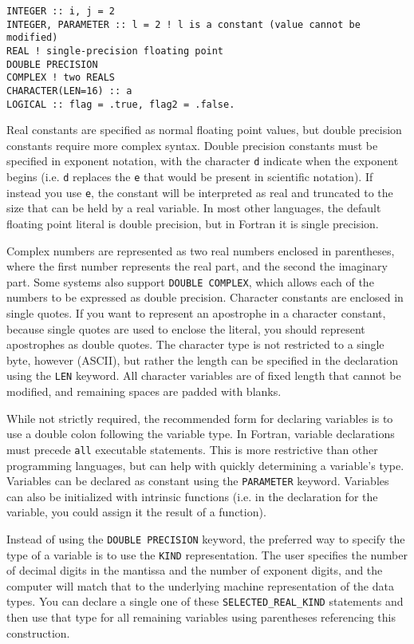 \documentclass[10pt]{article}
\begin{document}
\begin{lstlisting}
INTEGER :: i, j = 2
INTEGER, PARAMETER :: l = 2 ! l is a constant (value cannot be modified)
REAL ! single-precision floating point
DOUBLE PRECISION
COMPLEX ! two REALS
CHARACTER(LEN=16) :: a
LOGICAL :: flag = .true, flag2 = .false.
\end{lstlisting}

Real constants are specified as normal floating point values, but double precision constants require more complex syntax. Double precision constants must be specified in exponent notation, with the character {\tt d} indicate when the exponent begins (i.e. {\tt d} replaces the {\tt e} that would be present in scientific notation). If instead you use {\tt e}, the constant will be interpreted as real and truncated to the size that can be held by a real variable. In most other languages, the default floating point literal is double precision, but in Fortran it is single precision.

Complex numbers are represented as two real numbers enclosed in parentheses, where the first number represents the real part, and the second the imaginary part. Some systems also support {\tt DOUBLE COMPLEX}, which allows each of the numbers to be expressed as double precision. Character constants are enclosed in single quotes. If you want to represent an apostrophe in a character constant, because single quotes are used to enclose the literal, you should represent apostrophes as double quotes. The character type is not restricted to a single byte, however (ASCII), but rather the length can be specified in the declaration using the {\tt LEN} keyword. All character variables are of fixed length that cannot be modified, and remaining spaces are padded with blanks. 

While not strictly required, the recommended form for declaring variables is to use a double colon following the variable type. In Fortran, variable declarations must precede {\tt all} executable statements. This is more restrictive than other programming languages, but can help with quickly determining a variable's type. Variables can be declared as constant using the {\tt PARAMETER} keyword. Variables can also be initialized with intrinsic functions (i.e. in the declaration for the variable, you could assign it the result of a function). 

Instead of using the {\tt DOUBLE PRECISION} keyword, the preferred way to specify the type of a variable is to use the {\tt KIND} representation. The user specifies the number of decimal digits in the mantissa and the number of exponent digits, and the computer will match that to the underlying machine representation of the data types. You can declare a single one of these {\tt SELECTED\_REAL\_KIND} statements and then use that type for all remaining variables using parentheses referencing this construction.
\end{document}
